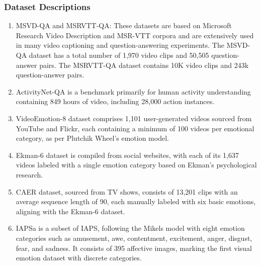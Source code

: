 \subsubsection{Dataset Descriptions}
\label{sec:Dataset Descriptions}
\begin{enumerate}
        \item MSVD-QA and MSRVTT-QA: These datasets are based on Microsoft Research Video Description \cite{chen2011collecting} and MSR-VTT corpora \cite{xu2016msr} and are extensively used in many video captioning and question-answering experiments. The MSVD-QA dataset has a total number of 1,970 video clips and 50,505 question-answer pairs. The MSRVTT-QA dataset contains 10K video clips and 243k question-answer pairs. 

        \item ActivityNet-QA \cite{caba2015activitynet} is a benchmark primarily for human activity understanding containing 849 hours of video, including 28,000 action instances.
        \item VideoEmotion-8 \cite{asur2010predicting} dataset comprises 1,101 user-generated videos sourced from YouTube and Flickr, each containing a minimum of 100 videos per emotional category, as per Plutchik Wheel's emotion model.
            
        \item Ekman-6 \cite{xu2016heterogeneous} dataset is compiled from social websites, with each of its 1,637 videos labeled with a single emotion category based on Ekman’s psychological research.
        
        \item CAER \cite{lee2019context} dataset, sourced from TV shows, consists of 13,201 clips with an average sequence length of 90, each manually labeled with six basic emotions, aligning with the Ekman-6 dataset. 

        \item IAPSa \cite{mikels2005emotional} is a subset of IAPS, following the Mikels model with eight emotion categories such as amusement, awe, contentment, excitement, anger, disgust, fear, and sadness. It consists of 395 affective images, marking the first visual emotion dataset with discrete categories.
        

\end{enumerate}
